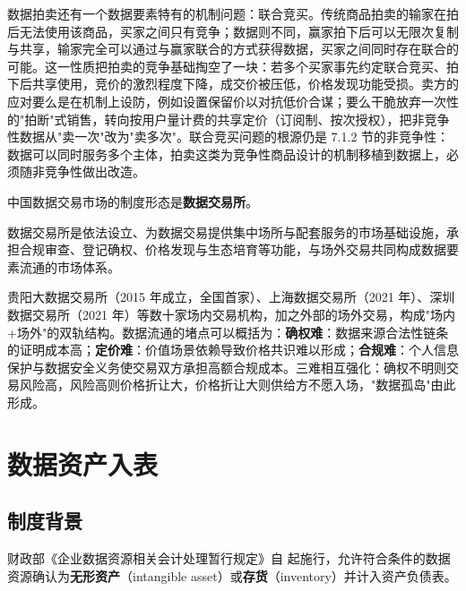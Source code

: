 数据拍卖还有一个数据要素特有的机制问题：联合竞买。传统商品拍卖的输家在拍后无法使用该商品，买家之间只有竞争；数据则不同，赢家拍下后可以无限次复制与共享，输家完全可以通过与赢家联合的方式获得数据，买家之间同时存在联合的可能。这一性质把拍卖的竞争基础掏空了一块：若多个买家事先约定联合竞买、拍下后共享使用，竞价的激烈程度下降，成交价被压低，价格发现功能受损。卖方的应对要么是在机制上设防，例如设置保留价以对抗低价合谋；要么干脆放弃一次性的"拍断"式销售，转向按用户量计费的共享定价（订阅制、按次授权），把非竞争性数据从"卖一次"改为"卖多次"。联合竞买问题的根源仍是 7.1.2 节的非竞争性：数据可以同时服务多个主体，拍卖这类为竞争性商品设计的机制移植到数据上，必须随非竞争性做出改造。

中国数据交易市场的制度形态是\textbf{数据交易所}。

\begin{definition}
数据交易所是依法设立、为数据交易提供集中场所与配套服务的市场基础设施，承担合规审查、登记确权、价格发现与生态培育等功能，与场外交易共同构成数据要素流通的市场体系。
\end{definition}

贵阳大数据交易所（2015 年成立，全国首家）、上海数据交易所（2021 年）、深圳数据交易所（2021 年）等数十家场内交易机构，加之外部的场外交易，构成"场内+场外"的双轨结构。数据流通的堵点可以概括为：\textbf{确权难}：数据来源合法性链条的证明成本高；\textbf{定价难}：价值场景依赖导致价格共识难以形成；\textbf{合规难}：个人信息保护与数据安全义务使交易双方承担高额合规成本。三难相互强化：确权不明则交易风险高，风险高则价格折让大，价格折让大则供给方不愿入场，"数据孤岛"由此形成。

\section{数据资产入表}

\subsection{制度背景}

财政部《企业数据资源相关会计处理暂行规定》自 起施行，允许符合条件的数据资源确认为\textbf{无形资产}（intangible asset）或\textbf{存货}（inventory）并计入资产负债表。

